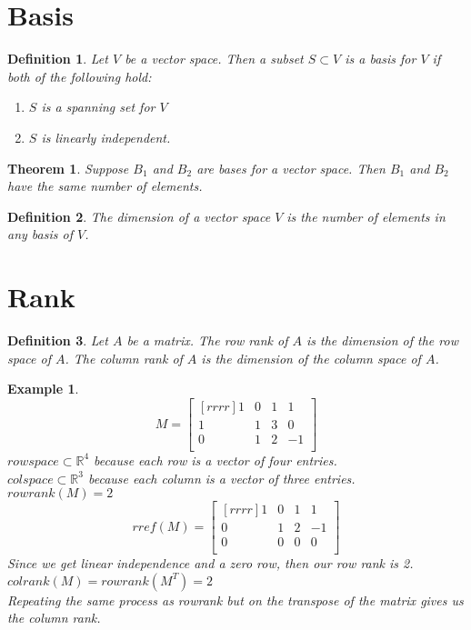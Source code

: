 \documentclass{report}
\newtheorem*{ex}{Example}
\newtheorem*{defn}{Definition}
\newtheorem*{thrm}{Theorem}
\begin{document}
\section{Basis}
\begin{defn}
Let $V$ be a vector space. Then a subset $S\subset V$ is a basis for $V$ if both of the following hold:
	\begin{enumerate}
	\item $S$ is a spanning set for $V$
	\item $S$ is linearly independent.
	\end{enumerate}
\end{defn}
\begin{thrm}
Suppose $B_1$ and $B_2$ are bases for a vector space. Then $B_1$ and $B_2$ have the same number of elements.
\end{thrm}
\begin{defn}
The dimension of a vector space $V$ is the number of elements in any basis of $V$.
\end{defn}

\section{Rank}
\begin{defn}
Let $A$ be a matrix. The row rank of $A$ is the dimension of the row space of $A$. The column rank of $A$ is the dimension of the column space of $A$.
\end{defn}
\begin{ex}
\[ M=\begin{bmatrix}[rrrr]1&0&1&1\\1&1&3&0\\0&1&2&-1\\\end{bmatrix} \]
$rowspace \subset \mathbb{R}^4$ because each row is a vector of four entries.\\
$colspace \subset \mathbb{R}^3$ because each column is a vector of three entries.\\
$rowrank(M)=2$
\[ rref(M)=\begin{bmatrix}[rrrr]1&0&1&1\\0&1&2&-1\\0&0&0&0\\\end{bmatrix} \]
Since we get linear independence and a zero row, then our row rank is 2.\\
$colrank(M)=rowrank(M^T)=2$\\
Repeating the same process as rowrank but on the transpose of the matrix gives us the column rank.
\end{ex}
\end{document}
